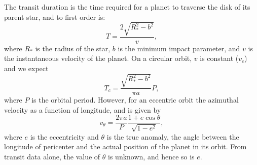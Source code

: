 The transit duration is the time required for a planet to traverse the
disk of its parent star, and to first order is:
\begin{equation}\label{eq:duration}
T = \frac{2 \sqrt{R_*^2 - b^2}}{v},
\end{equation}
where $R_*$ is the radius of the star, $b$ is the minimum impact
parameter, and $v$ is the instantaneous velocity of the planet. On a
circular orbit, $v$ is constant ($v_c$) and we expect
\begin{equation}\label{eq:durcirc}
T_c = \frac{\sqrt{R_*^2 - b^2}}{\pi a}P,
\end{equation}
where $P$ is the orbital period. However, for an eccentric orbit the
azimuthal velocity as a function of longitude, and is
given by
\begin{equation}\label{eq:velocity}
v_\theta = \frac{2\pi a}{P}\frac{1+e\cos\theta}{\sqrt{1-e^2}},
\end{equation}
where $e$ is the eccentricity and $\theta$ is the true anomaly, the
angle between the longitude of pericenter and the actual position of
the planet in its orbit. From transit data alone, the value of
$\theta$ is unknown, and hence so is $e$.


